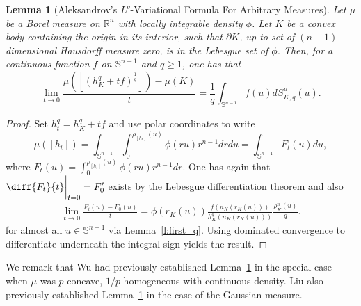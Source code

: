 \documentclass[11pt]{amsart}
\newtheorem{lemma}[theorem]{Lemma}
\theoremstyle{definition}
\theoremstyle{remark}
\numberwithin{equation}{section}
\newcommand{\R}{\mathbb{R}}
\newcommand{\s}{\mathbb{S}}
\begin{document}
	\begin{lemma}[Aleksandrov's $L^q$-Variational Formula For Arbitrary Measures]
	\label{l:second_q}
	Let $\mu$ be a Borel measure on $\R^n$ with locally integrable density $\phi$. Let $K$ be a convex body containing the origin in its interior, such that $\partial K$, up to set of $(n-1)$-dimensional Hausdorff measure zero, is in the Lebesgue set of $\phi$. Then, for a continuous function $f$ on $\s^{n-1}$ and $q\geq 1$, one has that
	$$\lim_{t\rightarrow 0}\frac{\mu([\left(h^q_K+tf\right)^{\frac{1}{q}}])-\mu(K)}{t}=\frac{1}{q}\int_{\s^{n-1}}f(u)dS^{\mu}_{K,q}(u).$$
	\end{lemma}
	\begin{proof}
	Set $h^q_t=h^q_K+tf$ and use polar coordinates to write
	$$\mu([h_t])=\int_{\s^{n-1}}\int_0^{\rho_{[h_t]}(u)}\phi(ru)r^{n-1}drdu=\int_{\s^{n-1}}F_t(u)du,$$
	where
	$F_t(u)=\int_0^{\rho_{[h_t]}(u)}\phi(ru)r^{n-1}dr.$ One has again that $\diff{F_t}{t}\bigg|_{t=0}=F^\prime_0$ exists by the Lebesgue differentiation theorem and also
	\begin{align*}\lim_{t\to 0}\frac{F_t(u)-F_0(u)}{t}=\phi(r_K(u))\frac{f(n_{K}(r_{K}(u)))}{h^q_K(n_K(r_K(u)))}\frac{\rho^{n}_K(u)}{q}.\end{align*} for almost all $u\in \s^{n-1}$ via Lemma~\ref{l:first_q}. Using dominated convergence to differentiate underneath the integral sign yields the result.
	\end{proof}
 \noindent We remark that Wu \cite{DW17} had previously established Lemma~\ref{l:second_q} in the special case when $\mu$ was $p$-concave, $1/p$-homogeneous with continuous density. Liu \cite{JL22} also previously established Lemma~\ref{l:second_q} in the case of the Gaussian measure.  
\end{document}
